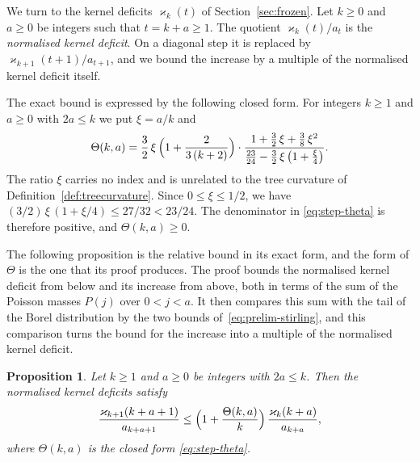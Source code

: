 \documentclass{amsart}
\newtheorem{proposition}[theorem]{Proposition}
\theoremstyle{definition}
\theoremstyle{remark}
\numberwithin{equation}{section}
\begin{document}
We turn to the kernel deficits $\varkappa_k(t)$ of
Section~\ref{sec:frozen}. Let $k\ge0$ and $a\ge0$ be integers such that
$t=k+a\ge1$. The quotient $\varkappa_k(t)/a_t$ is the \emph{normalised
kernel deficit}. On a diagonal step it is replaced by
$\varkappa_{k+1}(t+1)/a_{t+1}$, and we bound the increase by a multiple of
the normalised kernel deficit itself.

The exact bound is expressed by the following closed form. For integers
$k\ge1$ and $a\ge0$ with $2a\le k$ we put $\xi=a/k$ and
\begin{equation}\label{eq:step-theta}
\Theta(k,a)=\frac32\,\xi\,\Bigl(1+\frac{2}{3\,(k+2)}\Bigr)\cdot
\frac{1+\frac32\,\xi+\frac38\,\xi^2}
{\frac{23}{24}-\frac32\,\xi\,\bigl(1+\frac{\xi}{4}\bigr)}.
\end{equation}
The ratio $\xi$ carries no index and is unrelated to the tree curvature of
Definition~\ref{def:treecurvature}. Since $0\le\xi\le1/2$, we have
$(3/2)\,\xi\,(1+\xi/4)\le27/32<23/24$.
The denominator in \eqref{eq:step-theta} is therefore positive, and
$\Theta(k,a)\ge0$.

The following proposition is the relative bound in its exact form, and the
form of $\Theta$ is the one that its proof produces. The proof bounds the
normalised kernel deficit from below and its increase from above, both in
terms of the sum of the Poisson masses $P(j)$ over $0<j<a$. It then compares
this sum with the tail of the Borel distribution by the two bounds
of~\eqref{eq:prelim-stirling}, and this comparison turns the bound for the
increase into a multiple of the normalised kernel deficit.

\begin{proposition}\label{prop:deficitgrowth}
Let $k\ge1$ and $a\ge0$ be integers with $2a\le k$. Then the normalised
kernel deficits satisfy
\[
\frac{\varkappa_{k+1}(k+a+1)}{a_{k+a+1}}\le
\Bigl(1+\frac{\Theta(k,a)}{k}\Bigr)\,\frac{\varkappa_k(k+a)}{a_{k+a}},
\]
where $\Theta(k,a)$ is the closed form \eqref{eq:step-theta}.
\end{proposition}
\end{document}
